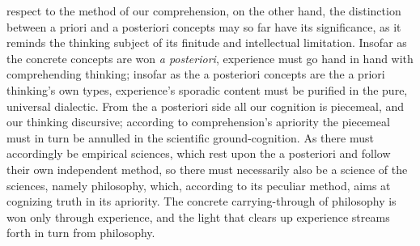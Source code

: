 \documentclass[12pt]{book}
\begin{document}
respect to the method of our comprehension, on the other hand, the
distinction between a priori and a posteriori concepts may so far have its
significance, as it reminds the thinking subject of its finitude and
intellectual limitation. Insofar as the concrete concepts are won \textit{a
posteriori}, experience must go hand in hand with comprehending thinking;
insofar as the a posteriori concepts are the a priori thinking's own types,
experience's sporadic content must be purified in the pure, universal
dialectic. From the a posteriori side all our cognition is piecemeal, and
our thinking discursive; according to comprehension's apriority the
piecemeal must in turn be annulled in the scientific ground-cognition. As
there must accordingly be empirical sciences, which rest upon the a
posteriori and follow their own independent method, so there must
necessarily also be a science of the sciences, namely philosophy, which,
according to its peculiar method, aims at cognizing truth in its apriority.
The concrete carrying-through of philosophy is won only through experience,
and the light that clears up experience streams forth in turn from
philosophy.
\end{document}
